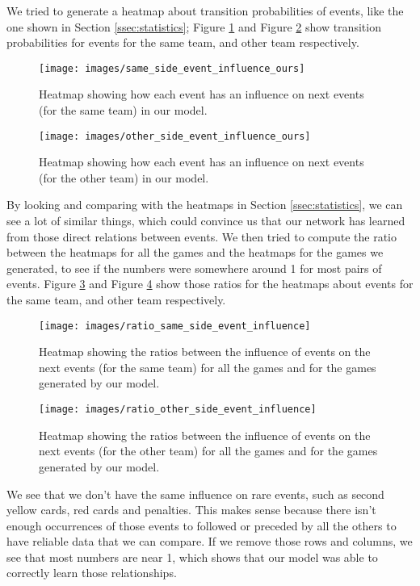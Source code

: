 \documentclass[10pt,conference,onecolumn]{IEEEtran}
\begin{document}
\begin{appendices}
We tried to generate a heatmap about transition probabilities of events, like the one shown in Section \ref{ssec:statistics}; Figure \ref{fig:same_side_event_influence_ours} and Figure \ref{fig:other_side_event_influence_ours} show transition probabilities for events for the same team, and other team respectively.

\begin{figure}[H]
\centering
\texttt{[image: images/same\_side\_event\_influence\_ours]}
\caption{Heatmap showing how each event has an influence on next events (for the same team) in our model.}
\label{fig:same_side_event_influence_ours}
\end{figure}

\begin{figure}[H]
\centering
\texttt{[image: images/other\_side\_event\_influence\_ours]}
\caption{Heatmap showing how each event has an influence on next events (for the other team) in our model.}
\label{fig:other_side_event_influence_ours}
\end{figure}

By looking and comparing with the heatmaps in Section \ref{ssec:statistics}, we can see a lot of similar things, which could convince us that our network has learned from those direct relations between events. We then tried to compute the ratio between the heatmaps for all the games and the heatmaps for the games we generated, to see if the numbers were somewhere around 1 for most pairs of events. Figure \ref{fig:ratio_same_side_event_influence} and Figure \ref{fig:ratio_other_side_event_influence} show those ratios for the heatmaps about events for the same team, and other team respectively.

\begin{figure}[H]
\centering
\texttt{[image: images/ratio\_same\_side\_event\_influence]}
\caption{Heatmap showing the ratios between the influence of events on the next events (for the same team) for all the games and for the games generated by our model.}
\label{fig:ratio_same_side_event_influence}
\end{figure}

\begin{figure}[H]
\centering
\texttt{[image: images/ratio\_other\_side\_event\_influence]}
\caption{Heatmap showing the ratios between the influence of events on the next events (for the other team) for all the games and for the games generated by our model.}
\label{fig:ratio_other_side_event_influence}
\end{figure}

We see that we don't have the same influence on rare events, such as second yellow cards, red cards and penalties. This makes sense because there isn't enough occurrences of those events to followed or preceded by all the others to have reliable data that we can compare. If we remove those rows and columns, we see that most numbers are near 1, which shows that our model was able to correctly learn those relationships.

\end{appendices}
\end{document}
